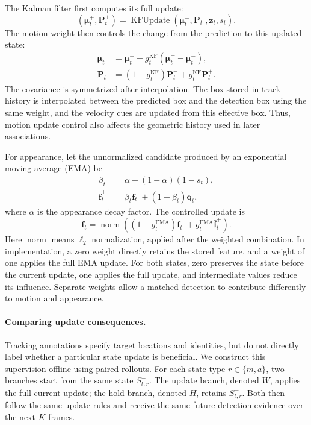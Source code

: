 \documentclass[a4paper,fleqn]{cas-sc}
\newcommand{\gm}{g_t^{\mathrm{KF}}}
\newcommand{\ga}{g_t^{\mathrm{EMA}}}
\begin{document}
The Kalman filter first computes its full update:
\begin{equation}
(\bm{\mu}_t^{+},\bm{P}_t^{+})
=\operatorname{KFUpdate}(\bm{\mu}_t^{-},\bm{P}_t^{-},\bm{z}_t,s_t).
\label{eq:full_kf}
\end{equation}
The motion weight then controls the change from the prediction to this updated state:
\begin{align}
\bm{\mu}_t &= \bm{\mu}_t^{-}+\gm(\bm{\mu}_t^{+}-\bm{\mu}_t^{-}),\\
\bm{P}_t &= (1-\gm)\bm{P}_t^{-}+\gm\bm{P}_t^{+}.
\label{eq:motion_assimilation}
\end{align}
The covariance is symmetrized after interpolation. The box stored in track history is interpolated between the predicted box and the detection box using the same weight, and the velocity cues are updated from this effective box. Thus, motion update control also affects the geometric history used in later associations.

For appearance, let the unnormalized candidate produced by an exponential moving average (EMA) be
\begin{align}
\beta_t &= \alpha+(1-\alpha)(1-s_t),\\
\bar{\bm{f}}_t^{+} &= \beta_t\bm{f}_t^{-}+(1-\beta_t)\bm{q}_t,
\label{eq:full_ema}
\end{align}
where $\alpha$ is the appearance decay factor. The controlled update is
\begin{equation}
\bm{f}_t=\operatorname{norm}\!\left(
(1-\ga)\bm{f}_t^{-}+\ga\bar{\bm{f}}_t^{+}
\right).
\label{eq:appearance_assimilation}
\end{equation}
Here $\operatorname{norm}$ means $\ell_2$ normalization, applied after the weighted combination. In implementation, a zero weight directly retains the stored feature, and a weight of one applies the full EMA update. For both states, zero preserves the state before the current update, one applies the full update, and intermediate values reduce its influence. Separate weights allow a matched detection to contribute differently to motion and appearance.

\paragraph{Comparing update consequences.}
Tracking annotations specify target locations and identities, but do not directly label whether a particular state update is beneficial. We construct this supervision offline using paired rollouts. For each state type $r\in\{m,a\}$, two branches start from the same state $S_{t,r}^{-}$. The update branch, denoted $W$, applies the full current update; the hold branch, denoted $H$, retains $S_{t,r}^{-}$. Both then follow the same update rules and receive the same future detection evidence over the next $K$ frames.
\end{document}
